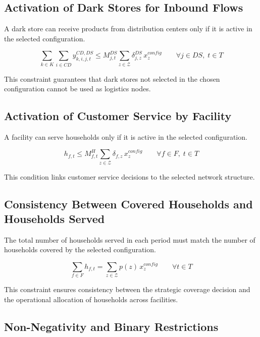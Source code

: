 \documentclass[12pt]{article}
\begin{document}
\subsection{Activation of Dark Stores for Inbound Flows}

A dark store can receive products from distribution centers only if it is active in the selected configuration.

\[
\sum_{k \in K}\sum_{i \in CD} y^{CD,DS}_{k,i,j,t}
\le
M^{DS}_{j,t}
\sum_{z \in \mathcal{Z}} \delta^{DS}_{j,z}\,x^{config}_z
\qquad \forall j \in DS,\; t \in T
\]

This constraint guarantees that dark stores not selected in the chosen configuration cannot be used as logistics nodes.

\vspace{0.4cm}

\subsection{Activation of Customer Service by Facility}

A facility can serve households only if it is active in the selected configuration.

\[
h_{f,t}
\le
M^{H}_{f,t}
\sum_{z \in \mathcal{Z}} \delta_{f,z}\,x^{config}_z
\qquad \forall f \in F,\; t \in T
\]

This condition links customer service decisions to the selected network structure.

\vspace{0.4cm}

\subsection{Consistency Between Covered Households and Households Served}

The total number of households served in each period must match the number of households covered by the selected configuration.

\[
\sum_{f \in F} h_{f,t}
=
\sum_{z \in \mathcal{Z}} p(z)\,x^{config}_z
\qquad \forall t \in T
\]

This constraint ensures consistency between the strategic coverage decision and the operational allocation of households across facilities.

\vspace{0.4cm}

\subsection{Non-Negativity and Binary Restrictions}
\end{document}
